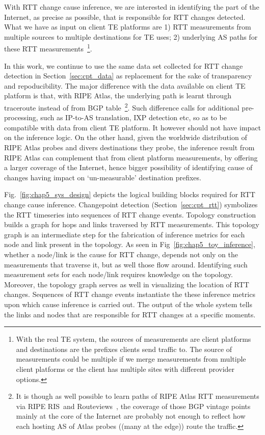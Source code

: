 With RTT change cause inference, we are interested in identifying the part of the Internet, as precise as possible, that is responsible for RTT changes detected. What we have as input on client TE platforms are 1) RTT measurements from multiple sources to multiple destinations for TE uses; 2) underlying AS paths for these RTT measurements~\footnote{With the real TE system, the sources of measurements are client platforms and destinations are the prefixes clients send traffic to. The source of measurements could be multiple if we merge measurements from multiple client platforms or the client has multiple sites with different provider options.}. 

In this work, we continue to use the same data set collected for RTT change detection in Section~\ref{sec:cpt_data} as replacement for the sake of transparency and repoducibility. The major difference with the data available on client TE platform is that, with RIPE Atlas, the underlying path is learnt through traceroute instead of from BGP table~\footnote{It is though as well possible to learn paths of RIPE Atlas RTT measurements via RIPE RIS~\cite{ris}and Routeviews~\cite{routeviews}, the coverage of those BGP vintage points mainly at the core of the Internet are probably not enough to reflect how each hosting AS of Atlas probes ((many at the edge)) route the traffic.}. 
Such difference calls for additional pre-processing, such as IP-to-AS translation, IXP detection etc, so as to be compatible with data from client TE platform. It however should not have impact on the inference logic. On the other hand, given the worldwide distribution of RIPE Atlas probes and divers destinations they probe, the inference result from RIPE Atlas can complement that from client platform measurements, by offering a larger coverage of the Internet, hence bigger possibility of identifying cause of changes having impact on `un-measurable' destination prefixes.

Fig.~\ref{fig:chap5_sys_design} depicts the logical building blocks required for RTT change cause inference. Changepoint detection (Section~\ref{sec:cpt_rtt}) symbolizes the RTT timeseries into sequences of RTT change events.
Topology construction builds a graph for hops and links traversed by RTT measurements.
This topology graph is an intermediate step for the fabrication of inference metrics for each node and link present in the topology. As seen in Fig~\ref{fig:chap5_toy_inference}, whether a node/link is the cause for RTT change, depends not only on the measurements that traverse it, but as well those flow around. Identifying such measurement sets for each node/link requires knowledge on the topology. Moreover, the topology graph serves as well in visualizing the location of RTT changes. 
Sequences of RTT change events instantiate the these inference metrics upon which cause inference is carried out.
The output of the whole system tells the links and nodes that are responsible for RTT changes at a specific moments.

